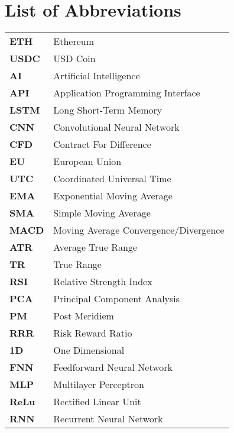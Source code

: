 \section*{List of Abbreviations}

\begin{tabularx}{\textwidth}{@{}lL{0.8\textwidth}@{}}
    \textbf{ETH}  & Ethereum                              \\
    \textbf{USDC} & USD Coin                              \\
    \textbf{AI}   & Artificial Intelligence               \\
    \textbf{API}  & Application Programming Interface     \\
    \textbf{LSTM} & Long Short-Term Memory                \\
    \textbf{CNN}  & Convolutional Neural Network          \\
    \textbf{CFD}  & Contract For Difference               \\
    \textbf{EU}   & European Union                        \\
    \textbf{UTC}  & Coordinated Universal Time            \\
    \textbf{EMA}  & Exponential Moving Average            \\
    \textbf{SMA}  & Simple Moving Average                 \\
    \textbf{MACD} & Moving Average Convergence/Divergence \\
    \textbf{ATR}  & Average True Range                    \\
    \textbf{TR}   & True Range                            \\
    \textbf{RSI}  & Relative Strength Index               \\
    \textbf{PCA}  & Principal Component Analysis          \\
    \textbf{PM}   & Post Meridiem                         \\
    \textbf{RRR}  & Risk Reward Ratio                     \\
    \textbf{1D}   & One Dimensional                       \\
    \textbf{FNN}  & Feedforward Neural Network            \\
    \textbf{MLP}  & Multilayer Perceptron                 \\
    \textbf{ReLu} & Rectified Linear Unit                 \\
    \textbf{RNN}  & Recurrent Neural Network              \\

\end{tabularx}
